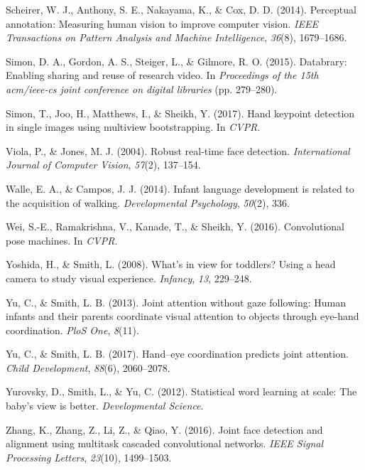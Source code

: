 \documentclass[english,man]{apa6}
\begin{document}
\hypertarget{ref-scheirer2014perceptual}{}
Scheirer, W. J., Anthony, S. E., Nakayama, K., \& Cox, D. D. (2014).
Perceptual annotation: Measuring human vision to improve computer
vision. \emph{IEEE Transactions on Pattern Analysis and Machine
Intelligence}, \emph{36}(8), 1679--1686.

\hypertarget{ref-simon2015databrary}{}
Simon, D. A., Gordon, A. S., Steiger, L., \& Gilmore, R. O. (2015).
Databrary: Enabling sharing and reuse of research video. In
\emph{Proceedings of the 15th acm/ieee-cs joint conference on digital
libraries} (pp. 279--280).

\hypertarget{ref-simon2017hand}{}
Simon, T., Joo, H., Matthews, I., \& Sheikh, Y. (2017). Hand keypoint
detection in single images using multiview bootstrapping. In
\emph{CVPR}.

\hypertarget{ref-viola2004robust}{}
Viola, P., \& Jones, M. J. (2004). Robust real-time face detection.
\emph{International Journal of Computer Vision}, \emph{57}(2), 137--154.

\hypertarget{ref-walle2014}{}
Walle, E. A., \& Campos, J. J. (2014). Infant language development is
related to the acquisition of walking. \emph{Developmental Psychology},
\emph{50}(2), 336.

\hypertarget{ref-wei2016cpm}{}
Wei, S.-E., Ramakrishna, V., Kanade, T., \& Sheikh, Y. (2016).
Convolutional pose machines. In \emph{CVPR}.

\hypertarget{ref-yoshida2008}{}
Yoshida, H., \& Smith, L. (2008). What's in view for toddlers? Using a
head camera to study visual experience. \emph{Infancy}, \emph{13},
229--248.

\hypertarget{ref-yu2013joint}{}
Yu, C., \& Smith, L. B. (2013). Joint attention without gaze following:
Human infants and their parents coordinate visual attention to objects
through eye-hand coordination. \emph{PloS One}, \emph{8}(11).

\hypertarget{ref-yu2017hand}{}
Yu, C., \& Smith, L. B. (2017). Hand--eye coordination predicts joint
attention. \emph{Child Development}, \emph{88}(6), 2060--2078.

\hypertarget{ref-yurovsky2012}{}
Yurovsky, D., Smith, L., \& Yu, C. (2012). Statistical word learning at
scale: The baby's view is better. \emph{Developmental Science}.

\hypertarget{ref-zhang2016}{}
Zhang, K., Zhang, Z., Li, Z., \& Qiao, Y. (2016). Joint face detection
and alignment using multitask cascaded convolutional networks.
\emph{IEEE Signal Processing Letters}, \emph{23}(10), 1499--1503.

\endgroup
\end{document}
